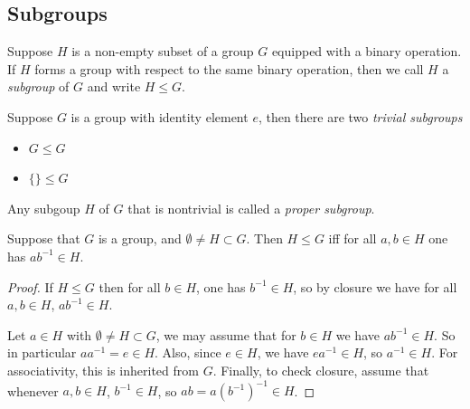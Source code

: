 \subsection{Subgroups}

\begin{definition}[subgroup]
	Suppose $H$ is a non-empty subset of a group $G$ equipped with a binary operation. If $H$ forms a group with respect to the same binary operation, then we call $H$ a \textit{subgroup} of $G$ and write $H\le G$.
\end{definition}

\begin{observation}
	Suppose $G$ is a group with identity element $e$, then there are two \textit{trivial subgroups}
	\begin{itemize}
		\item $G\le G$ 
		\item $\{\} \le G$
	\end{itemize}
	Any subgoup $H$ of $G$ that is nontrivial is called a \textit{proper subgroup}.
\end{observation}

\begin{lemma}
	Suppose that $G$ is a group, and $\emptyset \neq H \subset G$. Then $H\le G$ iff for all $a,b \in H$ one has $ab^{-1} \in H$.
\end{lemma}
\begin{proof}
	If  $H\le G$ then for all $b \in H$, one has $b^{-1}  \in H$, so by closure we have for all $a,b \in H$, $ab^{-1}  \in H$.

	Let $a \in H$ with $\emptyset \neq H \subset G$, we may assume that for $b \in H$ we have $ab^{-1} \in H$. So in particular $aa^{-1} = e \in H$. Also, since $e \in H$, we have $ea^{-1} \in H$, so $a^{-1}  \in H$. For associativity, this is inherited from $G$. Finally, to check closure, assume that whenever $a,b \in H$, $b^{-1}  \in H$, so $ab = a(b^{-1} )^{-1} \in H$.
\end{proof}

